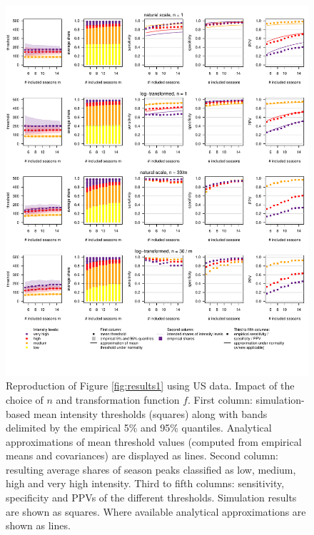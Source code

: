 \documentclass{article}
\begin{document}
\begin{figure}[h!]
\centering
\includegraphics[width=1\textwidth]{figure/plot_us.pdf}

\vspace{-1.5cm}

\caption{Reproduction of Figure \ref{fig:results1} using US data. Impact of the choice of $n$ and transformation function $f$. First column: simulation-based mean intensity thresholds (squares) along with bands delimited by the empirical 5\% and 95\% quantiles. Analytical approximations of mean threshold values (computed from empirical means and covariances) are displayed as lines. Second column: resulting average shares of season peaks classified as low, medium, high and very high intensity. Third to fifth columns: sensitivity, specificity and PPVs of the different thresholds. Simulation results are shown as squares. Where available analytical approximations are shown as lines.}
\label{fig:results1_us}
\end{figure}
\end{document}
